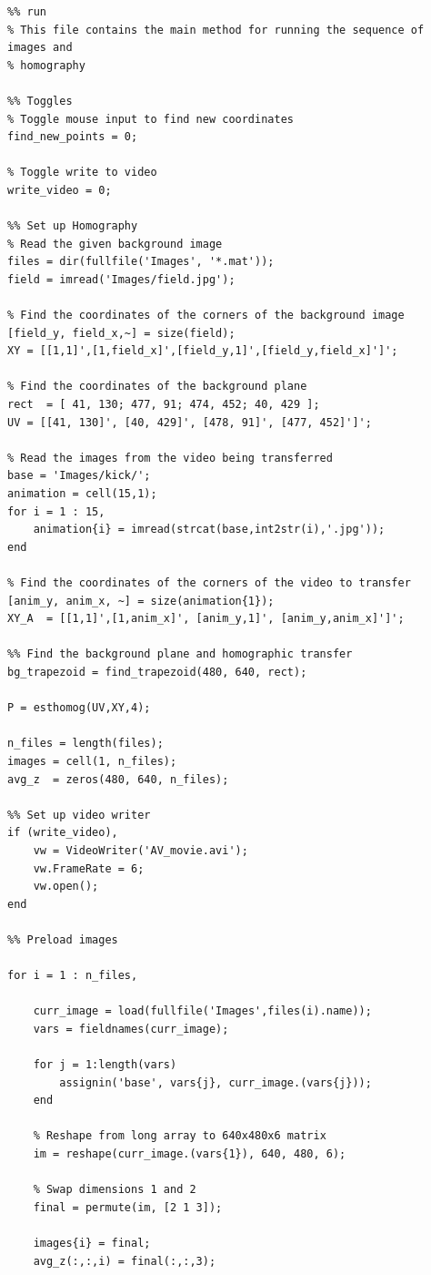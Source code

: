 \documentclass[11pt]{article}
\begin{document}
\begin{verbatim}
%% run
% This file contains the main method for running the sequence of images and
% homography

%% Toggles
% Toggle mouse input to find new coordinates
find_new_points = 0; 

% Toggle write to video
write_video = 0;

%% Set up Homography
% Read the given background image
files = dir(fullfile('Images', '*.mat'));
field = imread('Images/field.jpg');

% Find the coordinates of the corners of the background image
[field_y, field_x,~] = size(field);
XY = [[1,1]',[1,field_x]',[field_y,1]',[field_y,field_x]']';

% Find the coordinates of the background plane
rect  = [ 41, 130; 477, 91; 474, 452; 40, 429 ];
UV = [[41, 130]', [40, 429]', [478, 91]', [477, 452]']'; 

% Read the images from the video being transferred
base = 'Images/kick/';
animation = cell(15,1);
for i = 1 : 15,
    animation{i} = imread(strcat(base,int2str(i),'.jpg'));
end

% Find the coordinates of the corners of the video to transfer
[anim_y, anim_x, ~] = size(animation{1});
XY_A  = [[1,1]',[1,anim_x]', [anim_y,1]', [anim_y,anim_x]']';  

%% Find the background plane and homographic transfer
bg_trapezoid = find_trapezoid(480, 640, rect);

P = esthomog(UV,XY,4);

n_files = length(files);
images = cell(1, n_files);
avg_z  = zeros(480, 640, n_files);

%% Set up video writer
if (write_video),
    vw = VideoWriter('AV_movie.avi');
    vw.FrameRate = 6;
    vw.open();
end

%% Preload images

for i = 1 : n_files,

    curr_image = load(fullfile('Images',files(i).name));    
    vars = fieldnames(curr_image);
    
    for j = 1:length(vars)
        assignin('base', vars{j}, curr_image.(vars{j}));
    end

    % Reshape from long array to 640x480x6 matrix    
    im = reshape(curr_image.(vars{1}), 640, 480, 6);
    
    % Swap dimensions 1 and 2
    final = permute(im, [2 1 3]);
    
    images{i} = final;
    avg_z(:,:,i) = final(:,:,3);
    

\end{verbatim}
\end{document}
